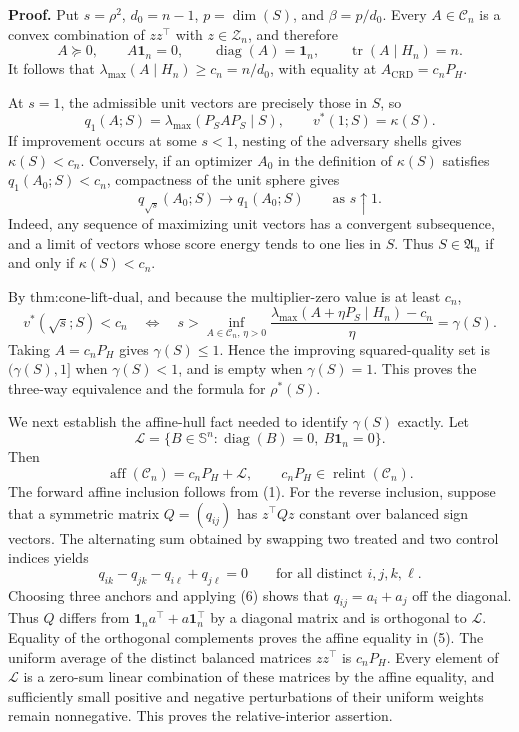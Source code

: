 \textbf{Proof.}
Put \(s=\rho^2\), \(d_0=n-1\), \(p=\dim(S)\), and \(\beta=p/d_0\).  Every \(A\in\mathcal C_n\) is a convex combination of \(zz^\top\) with \(z\in\mathcal Z_n\), and therefore
\[
A\succeq0,
\qquad
A\mathbf1_n=0,
\qquad
\operatorname{diag}(A)=\mathbf1_n,
\qquad
\operatorname{tr}(A\mid H_n)=n.
\tag{1}
\]
It follows that \(\lambda_{\max}(A\mid H_n)\geq c_n=n/d_0\), with equality at \(A_{\mathrm{CRD}}=c_nP_H\).

At \(s=1\), the admissible unit vectors are precisely those in \(S\), so
\[
q_1(A;S)=\lambda_{\max}(P_SAP_S\mid S),
\qquad
v^*(1;S)=\kappa(S).
\tag{2}
\]
If improvement occurs at some \(s<1\), nesting of the adversary shells gives \(\kappa(S)<c_n\).  Conversely, if an optimizer \(A_0\) in the definition of \(\kappa(S)\) satisfies \(q_1(A_0;S)<c_n\), compactness of the unit sphere gives
\[
q_{\sqrt{s}}(A_0;S)\longrightarrow q_1(A_0;S)
\qquad\text{as }s\uparrow1.
\tag{3}
\]
Indeed, any sequence of maximizing unit vectors has a convergent subsequence, and a limit of vectors whose score energy tends to one lies in \(S\).  Thus \(S\in\mathfrak A_n\) if and only if \(\kappa(S)<c_n\).

By \(\text{thm:cone-lift-dual}\), and because the multiplier-zero value is at least \(c_n\),
\[
v^*(\sqrt{s};S)<c_n
\quad\Longleftrightarrow\quad
s>\inf_{A\in\mathcal C_n,\,\eta>0}
\frac{\lambda_{\max}(A+\eta P_S\mid H_n)-c_n}{\eta}
=\gamma(S).
\tag{4}
\]
Taking \(A=c_nP_H\) gives \(\gamma(S)\leq1\).  Hence the improving squared-quality set is \((\gamma(S),1]\) when \(\gamma(S)<1\), and is empty when \(\gamma(S)=1\).  This proves the three-way equivalence and the formula for \(\rho^*(S)\).

We next establish the affine-hull fact needed to identify \(\gamma(S)\) exactly.  Let
\[
\mathcal L=\{B\in\mathbb S^n:\operatorname{diag}(B)=0,\ B\mathbf1_n=0\}.
\]
Then
\[
\operatorname{aff}(\mathcal C_n)=c_nP_H+\mathcal L,
\qquad
c_nP_H\in\operatorname{relint}(\mathcal C_n).
\tag{5}
\]
The forward affine inclusion follows from (1).  For the reverse inclusion, suppose that a symmetric matrix \(Q=(q_{ij})\) has \(z^\top Qz\) constant over balanced sign vectors.  The alternating sum obtained by swapping two treated and two control indices yields
\[
q_{ik}-q_{jk}-q_{i\ell}+q_{j\ell}=0
\qquad\text{for all distinct }i,j,k,\ell.
\tag{6}
\]
Choosing three anchors and applying (6) shows that \(q_{ij}=a_i+a_j\) off the diagonal.  Thus \(Q\) differs from \(\mathbf1_na^\top+a\mathbf1_n^\top\) by a diagonal matrix and is orthogonal to \(\mathcal L\).  Equality of the orthogonal complements proves the affine equality in (5).  The uniform average of the distinct balanced matrices \(zz^\top\) is \(c_nP_H\).  Every element of \(\mathcal L\) is a zero-sum linear combination of these matrices by the affine equality, and sufficiently small positive and negative perturbations of their uniform weights remain nonnegative.  This proves the relative-interior assertion.

